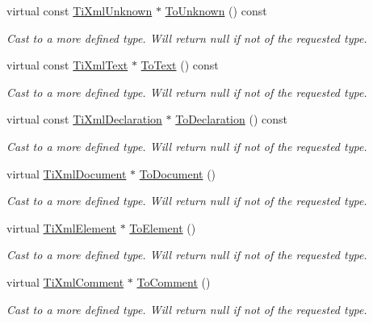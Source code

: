 \begin{DoxyCompactItemize}
virtual const \hyperlink{class_ti_xml_unknown}{Ti\-Xml\-Unknown} $\ast$ \hyperlink{class_ti_xml_node_afd7205cf31d7a376929f8a36930627a2}{To\-Unknown} () const 
\begin{DoxyCompactList}\small\item\em Cast to a more defined type. Will return null if not of the requested type. \end{DoxyCompactList}\item 
virtual const \hyperlink{class_ti_xml_text}{Ti\-Xml\-Text} $\ast$ \hyperlink{class_ti_xml_node_a95a46a52c525992d6b4ee08beb14cd69}{To\-Text} () const 
\begin{DoxyCompactList}\small\item\em Cast to a more defined type. Will return null if not of the requested type. \end{DoxyCompactList}\item 
virtual const \hyperlink{class_ti_xml_declaration}{Ti\-Xml\-Declaration} $\ast$ \hyperlink{class_ti_xml_node_a9f43e6984fc7d4afd6eb32714c6b7b72}{To\-Declaration} () const 
\begin{DoxyCompactList}\small\item\em Cast to a more defined type. Will return null if not of the requested type. \end{DoxyCompactList}\item 
virtual \hyperlink{class_ti_xml_document}{Ti\-Xml\-Document} $\ast$ \hyperlink{class_ti_xml_node_a6a4c8ac28ee7a745d059db6691e03bae}{To\-Document} ()
\begin{DoxyCompactList}\small\item\em Cast to a more defined type. Will return null if not of the requested type. \end{DoxyCompactList}\item 
virtual \hyperlink{class_ti_xml_element}{Ti\-Xml\-Element} $\ast$ \hyperlink{class_ti_xml_node_aa65d000223187d22a4dcebd7479e9ebc}{To\-Element} ()
\begin{DoxyCompactList}\small\item\em Cast to a more defined type. Will return null if not of the requested type. \end{DoxyCompactList}\item 
virtual \hyperlink{class_ti_xml_comment}{Ti\-Xml\-Comment} $\ast$ \hyperlink{class_ti_xml_node_a383e06a0787f7063953934867990f849}{To\-Comment} ()
\begin{DoxyCompactList}\small\item\em Cast to a more defined type. Will return null if not of the requested type. \end{DoxyCompactList}\item 

\end{DoxyCompactItemize}
